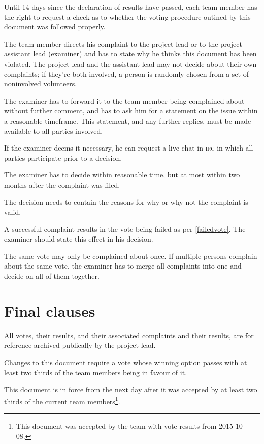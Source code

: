 \documentclass[10pt,a4paper,DIV=calc,headings=medium,twocolumn,final]{scrartcl}
\newcommand\irc{\textsc{irc}\xspace}
\begin{document}
\begin{contract}

  Until 14 days since the declaration of results have passed, each
  team member has the right to request a check as to whether the
  voting procedure outined by this document was followed properly.


  The team member directs his complaint to the project lead or to the
  project assistant lead (examiner) and has to state why he thinks
  this document has been violated. The project lead and the assistant
  lead may not decide about their own complaints; if they’re both
  involved, a person is randomly chosen from a set of noninvolved
  volunteers.

  The examiner has to forward it to the team member being complained
  about without further comment, and has to ask him for a statement on
  the issue within a reasonable timeframe. This statement, and any
  further replies, must be made available to all parties involved.

  If the examiner deems it necessary, he can request a live chat in
  \irc in which all parties participate prior to a decision.


  The examiner has to decide within reasonable time, but at most
  within two months after the complaint was filed.

  The decision needs to contain the reasons for why or why not the
  complaint is valid.


  A successful complaint results in the vote being failed as per
  \ref{failedvote}. The examiner should state this effect in his
  decision.


  The same vote may only be complained about once. If multiple persons
  complain about the same vote, the examiner has to merge all
  complaints into one and decide on all of them together.
\end{contract}

\section{Final clauses}

\begin{contract}

  All votes, their results, and their associated complaints and their
  results, are for reference archived publically by the project lead.


  Changes to this document require a vote whose winning option passes
  with at least two thirds of the team members being in favour of it.


  This document is in force from the next day after it was accepted by
  at least two thirds of the current team members\footnote{This
    document was accepted by the team with vote results from 2015-10-08.}.
\end{contract}
\end{document}
